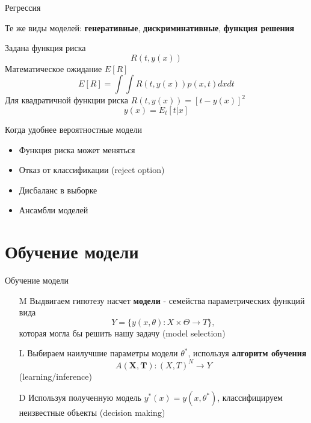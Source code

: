 \documentclass[10pt,a4paper]{beamer}
\begin{document}

\begin{frame}{Регрессия}

Те же виды моделей: {\bf генеративные}, {\bf дискриминативные}, {\bf функция решения}
\vspace{1em}

Задана функция риска
\[
R(t, y(x))
\]
Математическое ожидание $E[R]$
\[
E[R] = \int \!\! \int R(t, y(x)) p(x, t) dx dt 
\]
Для квадратичной функции риска $R(t, y(x)) = [t - y(x)]^2$
\[
y(x) = E_t[t | x]
\]

\end{frame}


\begin{frame}{Когда удобнее вероятностные модели}

\begin{itemize}

\item Функция риска может меняться
\item Отказ от классификации (reject option)
\item Дисбаланс в выборке
\item Ансамбли моделей

\end{itemize}

\end{frame}


\section{Обучение модели}


\begin{frame}{Обучение модели}


\begin{enumerate}

\item[M] {\color{gray} Выдвигаем гипотезу насчет {\bf модели} - семейства параметрических функций вида
\[
Y = \{ y(x, \theta) : X \times \Theta \rightarrow T \},
\]
которая могла бы решить нашу задачу (model selection)}

\item[L] {Выбираем наилучшие параметры модели $\theta^*$, используя {\bf алгоритм обучения}
\[
A(\boldsymbol X, \boldsymbol T) : (X, T)^N \rightarrow Y
\]
(learning/inference)}

\item[D] {\color{gray} Используя полученную модель $y^*(x) = y(x, \theta^*)$, классифицируем неизвестные объекты (decision making)}

\end{enumerate}

\end{frame}
\end{document}
